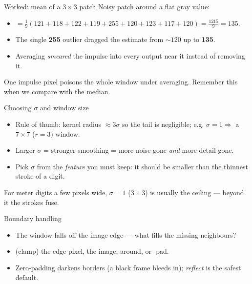 \documentclass[10pt,aspectratio=169]{beamer}
\begin{document}
\begin{frame}{Worked: mean of a $3\times3$ patch}
  Noisy patch around a flat gray value:
  \begin{center}\end{center}
  \begin{itemize}
    \item {} $=\frac{1}{9}(121{+}118{+}122{+}119{+}255{+}120{+}123{+}117{+}120)=\frac{1215}{9}=135$.
    \item The single \textbf{255} outlier dragged the estimate from $\sim120$ up to \textbf{135}.
    \item Averaging \emph{smeared} the impulse into every output near it instead of removing it.
  \end{itemize}
  \begin{badbox}
    One impulse pixel poisons the whole window under averaging. Remember this when we compare with the median.
  \end{badbox}
\end{frame}

\begin{frame}{Choosing $\sigma$ and window size}
  \begin{itemize}
    \item Rule of thumb: kernel radius $\approx 3\sigma$ so the tail is negligible; e.g. $\sigma=1 \Rightarrow$ a $7\times7$ ($r=3$) window.
    \item Larger $\sigma$ = stronger smoothing = more noise gone \emph{and} more detail gone.
    \item Pick $\sigma$ from the \emph{feature} you must keep: it should be smaller than the thinnest stroke of a digit.
  \end{itemize}
  \begin{infobox}
    For meter digits a few pixels wide, $\sigma\!=\!1$ ($3\times3$) is usually the ceiling — beyond it the strokes fuse.
  \end{infobox}
\end{frame}

\begin{frame}{Boundary handling}
  \begin{itemize}
    \item The window falls off the image edge — what fills the missing neighbours?
    \item {} (clamp) the edge pixel,  the image,  around, or -pad.
    \item Zero-padding darkens borders (a black frame bleeds in); \emph{reflect} is the safest default.
  \end{itemize}
  \begin{center}
  \end{center}
\end{frame}
\end{document}
